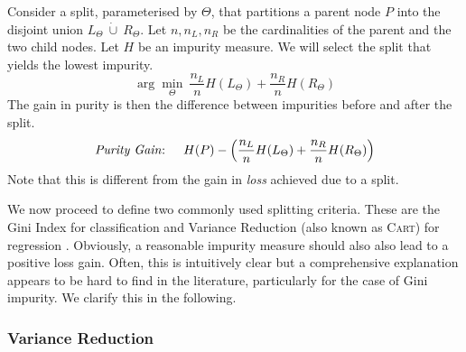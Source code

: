 \documentclass[../main.tex]{subfiles}
\begin{document}
Consider a split, parameterised by $\Theta$, that partitions a parent node $P$ into the disjoint union $L_{\Theta} ~\dot{\cup}~R_{\Theta}$. Let $n, n_{L}, n_{R}$ be the cardinalities of the parent and the two child nodes. Let $H$ be an impurity measure. We will select the split that yields the lowest impurity.
$$
\arg \min_{\Theta} ~ \frac{n_{L}}{n} H(L_{\Theta}) + \frac{n_{R}}{n} H(R_{\Theta})
$$
The gain in purity is then the difference between impurities before and after the split.
\begin{align}
\text{\textit{Purity Gain}: } \hspace{1em}
H(P) - \left(  \frac{n_{L}}{n} H(L_{\Theta}) + \frac{n_{R}}{n}H(R_{\Theta}) \right)
\label{eq:purity-gain}
\end{align}
Note that this is different from the gain in \textit{loss} achieved due to a split. 


We now proceed to define two commonly used splitting criteria. These are the Gini Index for classification and Variance Reduction (also known as \textsc{Cart}) for regression \cite{tibshirani_ElementsStatisticalLearning_2017}.
Obviously, a reasonable impurity measure should also also lead to a positive loss gain. Often, this is intuitively clear but a comprehensive explanation appears to be hard to find in the literature, particularly for the case of Gini impurity. We clarify this in the following.

\subsubsection{Variance Reduction}
\end{document}
